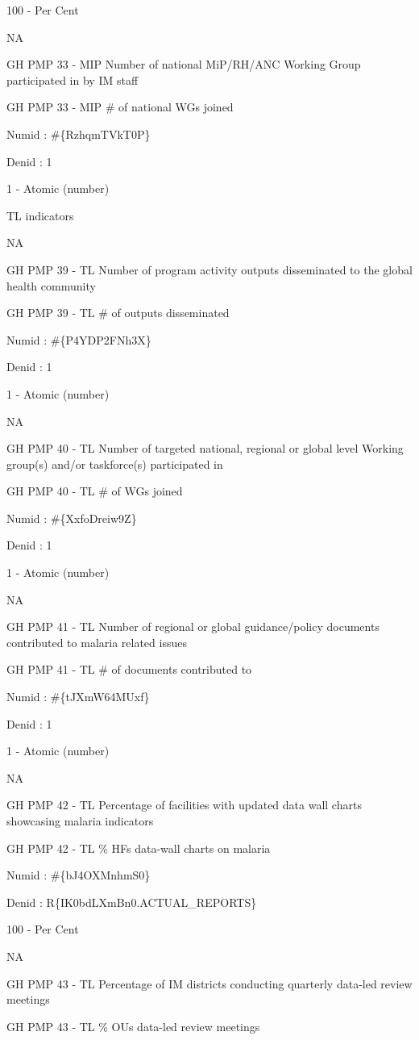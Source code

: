 \documentclass[]{book}
\begin{document}
100 - Per Cent

NA

GH PMP 33 - MIP Number of national MiP/RH/ANC Working Group participated in by IM staff

GH PMP 33 - MIP \# of national WGs joined

Numid : \#\{RzhqmTVkT0P\}

Denid : 1

1 - Atomic (number)

TL indicators

NA

GH PMP 39 - TL Number of program activity outputs disseminated to the global health community

GH PMP 39 - TL \# of outputs disseminated

Numid : \#\{P4YDP2FNh3X\}

Denid : 1

1 - Atomic (number)

NA

GH PMP 40 - TL Number of targeted national, regional or global level Working group(s) and/or taskforce(s) participated in

GH PMP 40 - TL \# of WGs joined

Numid : \#\{XxfoDreiw9Z\}

Denid : 1

1 - Atomic (number)

NA

GH PMP 41 - TL Number of regional or global guidance/policy documents contributed to malaria related issues

GH PMP 41 - TL \# of documents contributed to

Numid : \#\{tJXmW64MUxf\}

Denid : 1

1 - Atomic (number)

NA

GH PMP 42 - TL Percentage of facilities with updated data wall charts showcasing malaria indicators

GH PMP 42 - TL \% HFs data-wall charts on malaria

Numid : \#\{bJ4OXMnhmS0\}

Denid : R\{IK0bdLXmBn0.ACTUAL\_REPORTS\}

100 - Per Cent

NA

GH PMP 43 - TL Percentage of IM districts conducting quarterly data-led review meetings

GH PMP 43 - TL \% OUs data-led review meetings
\end{document}
